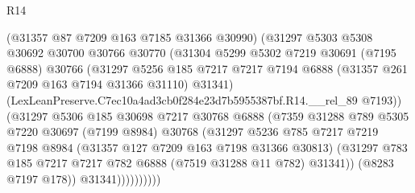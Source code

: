 \begin{lexlean}{R14}
\begin{coremodule}
                            (@31357 @87 @7209 @163 @7185 @31366 @30990)
                            (@31297
                              @5303
                              @5308
                              @30692
                              @30700
                              @30766
                              @30770
                              (@31304
                                @5299
                                @5302
                                @7219
                                @30691
                                (@7195 @6888)
                                @30766
                                (@31297
                                  @5256
                                  @185
                                  @7217
                                  @7217
                                  @7194
                                  @6888
                                  (@31357 @261 @7209 @163 @7194 @31366 @31110)
                                  @31341)
                                (LexLeanPreserve.C7ec10a4ad3cb0f284e23d7b5955387bf.R14.__rel_89
                                  @7193))
                              (@31297
                                @5306
                                @185
                                @30698
                                @7217
                                @30768
                                @6888
                                (@7359
                                  @31288
                                  @789
                                  @5305
                                  @7220
                                  @30697
                                  (@7199 @8984)
                                  @30768
                                  (@31297
                                    @5236
                                    @785
                                    @7217
                                    @7219
                                    @7198
                                    @8984
                                    (@31357 @127 @7209 @163 @7198 @31366 @30813)
                                    (@31297
                                      @783
                                      @185
                                      @7217
                                      @7217
                                      @782
                                      @6888
                                      (@7519 @31288 @11 @782)
                                      @31341))
                                  (@8283 @7197 @178))
                                @31341))))))))))

\end{coremodule}
\end{lexlean}
